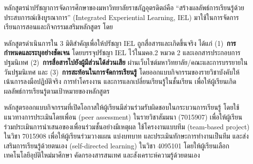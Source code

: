 


หลักสูตรนำปรัชญาการจัดการศึกษาของมหาวิทยาลัยราชภัฏอุตรดิตถ์คือ ``สร้างผลลัพธ์การเรียนรู้ด้วยประสบการณ์เชิงบูรณาการ'' (Integrated Experiential Learning, IEL) มาใช้ในการจัดการเรียนการสอนและกิจกรรมเสริมหลักสูตร โดย

หลักสูตรดำเนินการใน 3 มิติสำคัญเพื่อให้ปรัชญา IEL ถูกสื่อสารและเกิดขึ้นจริง ได้แก่ (1)~\textbf{การกำหนดและระบุอย่างชัดเจน} โดยบรรจุปรัชญา IEL ไว้ในมคอ.2 หมวด 2 และเอกสารประกอบการปฐมนิเทศ (2)~\textbf{การสื่อสารไปยังผู้มีส่วนได้ส่วนเสีย} ผ่านเว็บไซต์มหาวิทยาลัย/คณะและการบรรยายในวันปฐมนิเทศ และ (3)~\textbf{การสะท้อนในการจัดการเรียนรู้} โดยออกแบบกิจกรรมของรายวิชาบังคับให้เน้นการลงมือปฏิบัติจริง การทำโครงงาน และการแลกเปลี่ยนเรียนรู้ในชั้นเรียน เพื่อให้ผู้เรียนเกิดผลลัพธ์การเรียนรู้ตามเป้าหมายของหลักสูตร


หลักสูตรออกแบบกิจกรรมที่เปิดโอกาสให้ผู้เรียนมีส่วนร่วมรับผิดชอบในกระบวนการเรียนรู้ โดยใช้แนวทางการประเมินโดยเพื่อน (peer assessment) ในรายวิชาสัมมนา (7015907) เพื่อให้ผู้เรียนร่วมประเมินการนำเสนอของเพื่อนร่วมชั้นอย่างมีเหตุผล ใช้โครงงานแบบทีม (team-based project) ในวิชา 7015908 เพื่อให้ผู้เรียนร่วมวางแผน แบ่งบทบาท และประเมินทักษะการทำงานเป็นทีม และส่งเสริมการเรียนรู้ด้วยตนเอง (self-directed learning) ในวิชา 4095101 โดยให้ผู้เรียนเลือกเทคโนโลยีอุบัติใหม่มาศึกษา คัดกรองสารสนเทศ และสังเคราะห์ความรู้ด้วยตนเอง



